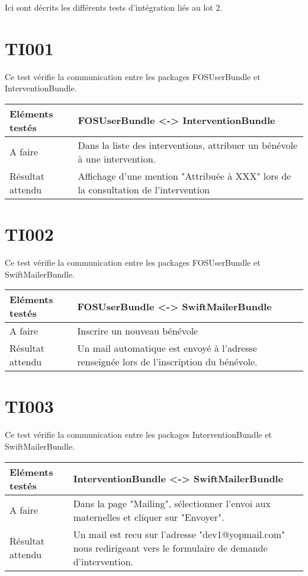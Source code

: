 
Ici sont décrits les différents tests d'intégration liés au lot 2.

\section{TI001}
	 Ce test vérifie la communication entre les packages FOSUserBundle et InterventionBundle.
	 \begin{center}
     	\begin{tabular}[h]{|p{}|p{}|}
		\hline
			Eléments testés & FOSUserBundle <-> InterventionBundle \\\hline
    			A faire & Dans la liste des interventions, attribuer un bénévole à une intervention. \\\hline
    			Résultat attendu & Affichage d'une mention "Attribuée à XXX" lors de la consultation de l'intervention \\\hline
     	\end{tabular}
  	\end{center}	
  	
\section{TI002}
	 Ce test vérifie la communication entre les packages FOSUserBundle et SwiftMailerBundle.
	 \begin{center}
     	\begin{tabular}[h]{|p{}|p{}|}
		\hline
			Eléments testés & FOSUserBundle <-> SwiftMailerBundle \\\hline
    			A faire & Inscrire un nouveau bénévole \\\hline
    			Résultat attendu & Un mail automatique est envoyé à l'adresse renseignée lors de l'inscription du bénévole. \\\hline
     	\end{tabular}
  	\end{center}	
  	
  	
 \section{TI003}
	 Ce test vérifie la communication entre les packages InterventionBundle et SwiftMailerBundle.
	 \begin{center}
     	\begin{tabular}[h]{|p{}|p{}|}
		\hline
			Eléments testés & InterventionBundle <-> SwiftMailerBundle \\\hline
    			A faire & Dans la page "Mailing", sélectionner l'envoi aux maternelles et cliquer sur "Envoyer". \\\hline
    			Résultat attendu & Un mail est recu sur l'adresse "dev1@yopmail.com" nous redirigeant vers le formulaire de demande d'intervention. \\\hline
     	\end{tabular}
  	\end{center}		
